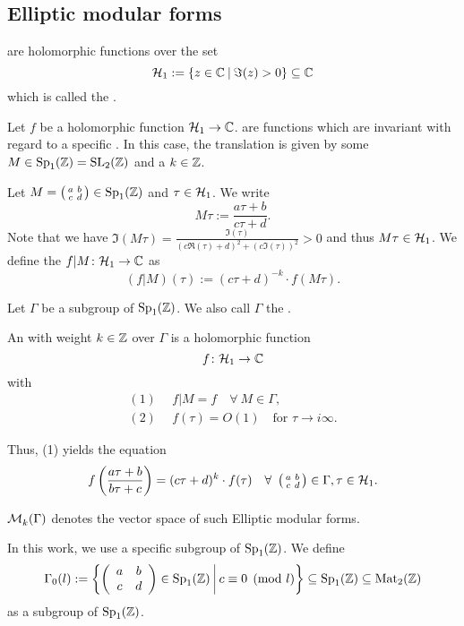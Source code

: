 

\subsection{Elliptic modular forms}
 are holomorphic functions over the set
\[ \SiegelHalfPlane_1 := \Set{z \in \C}{\Im(z) > 0} \subseteq \C \]
which is called the .

Let $f$ be a holomorphic function $\mathcal{H}_1 \rightarrow \mathbb{C}$.  are functions which are invariant with regard to a specific . In this case, the translation is given by some $M \in \operatorname{Sp}_1(\mathbb{Z}) = \operatorname{SL}_2(\mathbb{Z})$ and a  $k \in \mathbb{Z}$.

Let $M = \left( \begin{smallmatrix} a & b \\ c & d \end{smallmatrix} \right) \in \operatorname{Sp}_1(\mathbb{Z})$ and $\tau \in \mathcal{H}_1$. We write
\[ M \tau := \frac{a \tau + b}{c \tau + d} . \]
Note that we have $\Im(M\tau) = \frac{\Im(\tau)}{(c\Re(\tau)+d)^2 + (c \Im(\tau))^2} > 0$ and thus $M \tau \in \mathcal{H}_1$.
We define the  $f | M \colon \mathcal{H}_1 \rightarrow \mathbb{C}$ as
\[ (f | M) (\tau) :=  (c \tau + d)^{-k} \cdot f(M \tau) . \]

Let $\Gamma$ be a subgroup of $\operatorname{Sp}_1(\mathbb{Z})$. We also call $\Gamma$ the .

An  with weight $k \in \mathbb{Z}$ over $\Gamma$ is a holomorphic function
\[ f \colon \mathcal{H}_1 \rightarrow \mathbb{C} \]
with
\begin{align*}
(1) \ \ & f | M  = f \quad \forall \ M \in \Gamma, \\
(2) \ \ & f(\tau) = O(1) \quad \text{for } \tau \rightarrow i \infty .
\end{align*}

Thus, (1) yields the equation
\[ f\left(\frac{a \tau + b}{b \tau + c}\right) = (c \tau + d)^k \cdot f(\tau) \quad \forall \ \left( \begin{smallmatrix} a & b \\ c & d \end{smallmatrix} \right) \in \Gamma, \tau \in \mathcal{H}_1 . \]

$\operatorname{\mathcal{M}}^{}_k (\Gamma)$ denotes the vector space of such Elliptic modular forms.

In this work, we use a specific subgroup of $\operatorname{Sp}_1(\mathbb{Z})$. We define
\[ \Gamma_0(l) := \Set{\SimpleMatrix{a}{b}{c}{d} \in \Sp_1(\Z)}{c \equiv 0 \pmod{l}} \subseteq \Sp_1(\Z) \subseteq \M_2(\Z) \]
as a subgroup of $\operatorname{Sp}_1(\mathbb{Z})$.

